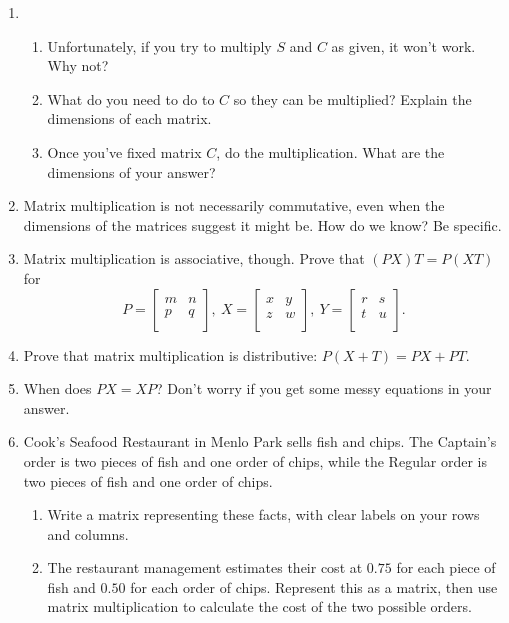 \documentclass[../gatm.tex]{subfiles}
\begin{document}
\begin{enumerate}
\setcounter{enumi}{\value{mtrx_mult_problem_i}}
\item \begin{enumerate}
\item Unfortunately, if you try to multiply $S$ and $C$ as given, it won't work. Why not?
\item What do you need to do to $C$ so they can be multiplied? Explain the dimensions of each matrix.
\item Once you've fixed matrix $C$, do the multiplication. What are the dimensions of your answer?
\end{enumerate}
\item Matrix multiplication is not necessarily commutative, even when the dimensions of the matrices suggest it might be. How do we know? Be specific.
\item Matrix multiplication is associative, though. Prove that $(PX)T=P(XT)$ for $$P=\left[\begin{array}{cc} m & n \\ p & q \\ \end{array}\right],\: X=\left[\begin{array}{cc} x & y \\ z & w \\ \end{array}\right],\: Y=\left[\begin{array}{cc} r & s \\ t & u \\ \end{array}\right].$$
\item Prove that matrix multiplication is distributive: $P(X+T)=PX+PT$.
\item When does $PX=XP$? Don't worry if you get some messy equations in your answer.
\item Cook's Seafood Restaurant in Menlo Park sells fish and chips. The Captain's order is two pieces of fish and one order of chips, while the Regular order is two pieces of fish and one order of chips.
\begin{enumerate}
\item Write a matrix representing these facts, with clear labels on your rows and columns.
\item The restaurant management estimates their cost at $0.75$ for each piece of fish and $0.50$ for each order of chips. Represent this as a matrix, then use matrix multiplication to calculate the cost of the two possible orders.

\end{enumerate}
\end{enumerate}
\end{document}
